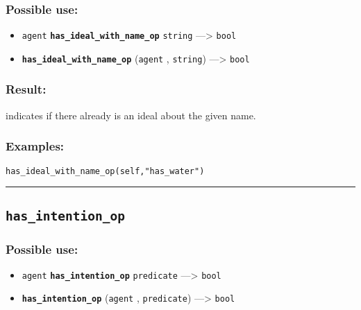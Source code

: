 \documentclass[]{book}
\providecommand{\tightlist}{%
  \setlength{\itemsep}{0pt}\setlength{\parskip}{0pt}}
\theoremstyle{definition}
\theoremstyle{definition}
\theoremstyle{definition}
\theoremstyle{remark}
\begin{document}
\subsubsection{Possible use:}\label{possible-use-251}

\begin{itemize}
\tightlist
\item
  \texttt{agent} \textbf{\texttt{has\_ideal\_with\_name\_op}}
  \texttt{string} ---\textgreater{} \texttt{bool}
\item
  \textbf{\texttt{has\_ideal\_with\_name\_op}} (\texttt{agent} ,
  \texttt{string}) ---\textgreater{} \texttt{bool}
\end{itemize}

\subsubsection{Result:}\label{result-242}

indicates if there already is an ideal about the given name.

\subsubsection{Examples:}\label{examples-191}

\begin{verbatim}
has_ideal_with_name_op(self,"has_water") 
\end{verbatim}

\begin{center}\rule{0.5\linewidth}{\linethickness}\end{center}

\subsection{\texorpdfstring{\texttt{has\_intention\_op}}{has\_intention\_op}}\label{has_intention_op}

\subsubsection{Possible use:}\label{possible-use-252}

\begin{itemize}
\tightlist
\item
  \texttt{agent} \textbf{\texttt{has\_intention\_op}} \texttt{predicate}
  ---\textgreater{} \texttt{bool}
\item
  \textbf{\texttt{has\_intention\_op}} (\texttt{agent} ,
  \texttt{predicate}) ---\textgreater{} \texttt{bool}
\end{itemize}
\end{document}
